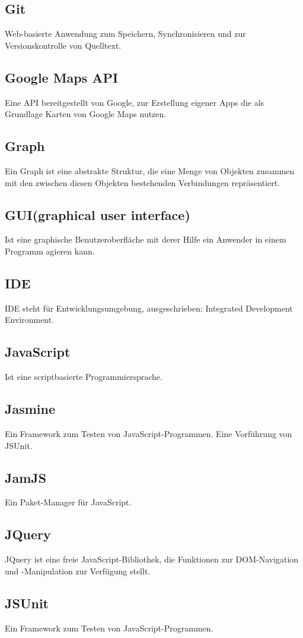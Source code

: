 \documentclass[11pt,a4paper]{article}
\begin{document}
\subsection{Git}
Web-basierte Anwendung zum Speichern, Synchronisieren und zur Versionskontrolle von Quelltext.
\subsection{Google Maps API}
Eine API bereitgestellt von Google, zur Erstellung eigener Apps die als Grundlage Karten von Google Maps nutzen.
\subsection{Graph}
Ein Graph ist eine abstrakte Struktur, die eine Menge von Objekten zusammen mit den zwischen diesen Objekten bestehenden Verbindungen repräsentiert.
\subsection{GUI(graphical user interface)} Ist eine graphische Benutzeroberfläche mit derer Hilfe ein Anwender in einem Programm agieren kann.
\subsection{IDE} 
IDE steht für Entwicklungsumgebung, ausgeschrieben: Integrated Development Environment.
\subsection{JavaScript} Ist eine scriptbasierte Programmiersprache.
\subsection{Jasmine} Ein Framework zum Testen von JavaScript-Programmen. Eine Vorführung von JSUnit.
\subsection{JamJS}
Ein Paket-Manager für JavaScript.
\subsection{JQuery}
JQuery ist eine freie JavaScript-Bibliothek, die Funktionen zur DOM-Navigation und -Manipulation zur Verfügung stellt.
\subsection{JSUnit} Ein Framework zum Testen von JavaScript-Programmen.
\end{document}
